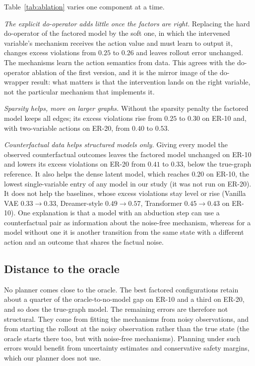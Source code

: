Table~\ref{tab:ablation} varies one component at a time.

\emph{The explicit do-operator adds little once the factors are right.}
Replacing the hard do-operator of the factored model by the soft one, in
which the intervened variable's mechanism receives the action value and must
learn to output it, changes excess violations from $0.25$ to $0.26$ and leaves
rollout error unchanged. The mechanisms learn the action semantics from data.
This agrees with the do-operator ablation of the first version, and it is the
mirror image of the do-wrapper result: what matters is that the intervention
lands on the right variable, not the particular mechanism that implements it.

\emph{Sparsity helps, more on larger graphs.} Without the sparsity penalty
the factored model keeps all edges; its excess violations rise from $0.25$ to
$0.30$ on ER-10 and, with two-variable actions on ER-20, from $0.40$ to
$0.53$.

\emph{Counterfactual data helps structured models only.} Giving every model
the observed counterfactual outcomes leaves the factored model unchanged on
ER-10 and lowers its excess violations on ER-20 from $0.41$ to $0.33$, below
the true-graph reference. It also helps the dense latent model, which
reaches $0.20$ on ER-10, the lowest single-variable entry of any model in our
study (it was not run on ER-20). It does not help the baselines, whose excess
violations stay level or rise (Vanilla VAE $0.33 \to 0.33$, Dreamer-style
$0.49 \to 0.57$, Transformer $0.45 \to 0.43$ on ER-10). One explanation is
that a model with an abduction step can use a counterfactual pair as
information about the noise-free mechanism, whereas for a model without one
it is another transition from the same state with a different action and an
outcome that shares the factual noise.

\subsection{Distance to the oracle}

No planner comes close to the oracle. The best factored configurations
retain about a quarter of the oracle-to-no-model gap on ER-10 and a third on
ER-20, and so does the true-graph model. The remaining errors are therefore
not structural. They come from fitting the mechanisms from noisy
observations, and from starting the rollout at the noisy observation rather
than the true state (the oracle starts there too, but with noise-free
mechanisms). Planning under such errors would benefit from uncertainty
estimates and conservative safety margins, which our planner does not use.
